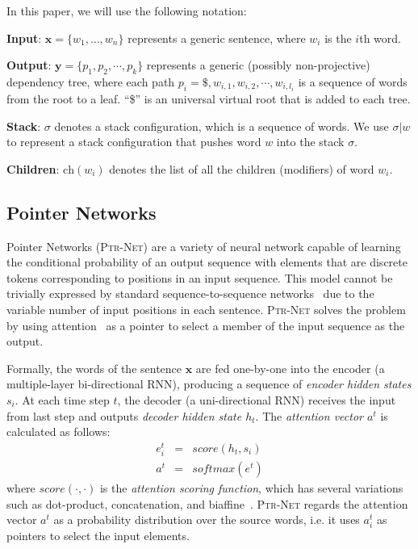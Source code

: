 \documentclass[11pt,a4paper]{article}
\begin{document}
In this paper, we will use the following notation: 

\textbf{Input}: $\mathbf{x} = \{w_1, \ldots, w_n \}$ represents 
a generic sentence, where $w_i$ is the $i$th word.

\textbf{Output}: $\mathbf{y} = \{ p_1, p_2, \cdots, p_k \}$ represents a generic (possibly non-projective) dependency tree, where each path $p_i = \$, w_{i,1}, w_{i,2}, \cdots, w_{i,l_i}$ is a sequence of words from the root to a leaf.
``\$'' is an universal virtual root that is added to each tree.

\textbf{Stack}: $\sigma$ denotes a stack configuration, which is a sequence of words. We use $\sigma|w$ to represent a stack configuration that pushes word $w$ into the stack $\sigma$.

\textbf{Children}: $\mathrm{ch}(w_i)$ denotes the list of all the children (modifiers) of word $w_i$.

\subsection{Pointer Networks}\label{subsec:ptr}
Pointer Networks (\textsc{Ptr-Net}) \citep{vinyals2015pointer} are a variety of neural network capable of learning the conditional probability of an output sequence with elements that are discrete tokens corresponding to positions in an input sequence.
This model cannot be trivially expressed by standard sequence-to-sequence networks~\citep{sutskever2014sequence} due to the variable number of input positions in each sentence. 
\textsc{Ptr-Net} solves the problem by using attention~\citep{bahdanau2015,luong-pham-manning:2015:EMNLP} as a pointer to select a member of the input sequence as the output.

Formally, the words of the sentence $\mathbf{x}$ are fed one-by-one into the encoder (a multiple-layer bi-directional RNN), producing a sequence of \emph{encoder hidden states $s_i$}. 
At each time step $t$, the decoder (a uni-directional RNN) receives the input from last step and outputs \emph{decoder hidden state $h_t$}. 
The \emph{attention vector $a^t$} is calculated as follows: 
\begin{equation}\label{eq:attention}
\begin{array}{rcl}
e^{t}_{i} & = & \mathit{score}(h_t, s_i) \\
a^t & = & \mathit{softmax}(e^t)
\end{array}
\end{equation}
where $\mathit{score}(\cdot, \cdot)$ is the \emph{attention scoring function}, which has several variations such as dot-product, concatenation, and biaffine~\citep{luong-pham-manning:2015:EMNLP}. 
\textsc{Ptr-Net} regards the attention vector $a^t$ as a probability distribution over the source words, i.e. it uses $a^t_i$ as pointers to select the input elements.
\end{document}
